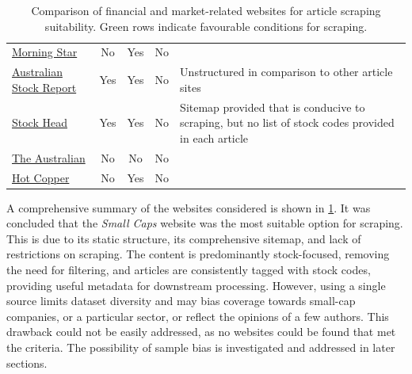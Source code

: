 \begin{table}[ht]
\begin{tabular}{@{}p{3.5cm}ccc p{6.2cm}@{}}
    \href{https://www.morningstar.com.au/}{Morning Star} & No & Yes & No & \\
    \rowcolor{rowgreen}
    \href{https://www.australianstockreport.com.au/}{Australian Stock Report} & Yes & Yes & No & Unstructured in comparison to other article sites \\
    \rowcolor{rowgreen}
    \href{https://stockhead.com.au/}{Stock Head} & Yes & Yes & No & Sitemap provided that is conducive to scraping, but no list of stock codes provided in each article \\
    \href{https://www.theaustralian.com.au/}{The Australian} & No & No & No &  \\
    \href{https://hotcopper.com.au/}{Hot Copper} & No & Yes & No &  \\
    \bottomrule
    \end{tabular}
    \caption{Comparison of financial and market-related websites for article scraping suitability. Green rows indicate favourable conditions for scraping.}
    \label{tab:scraping_websites}
\end{table}
    

A comprehensive summary of the websites considered is shown in \cref{tab:scraping_websites}. It was concluded that the \textit{Small Caps} website was the most suitable option for scraping. This is due to its static structure, its comprehensive sitemap, and lack of restrictions on scraping. The content is predominantly stock-focused, removing the need for filtering, and articles are consistently tagged with stock codes, providing useful metadata for downstream processing. However, using a single source limits dataset diversity and may bias coverage towards small-cap companies, or a particular sector, or reflect the opinions of a few authors. This drawback could not be easily addressed, as no websites could be found that met the criteria. The possibility of sample bias is investigated and addressed in later sections.

\newpage

\clearpage



